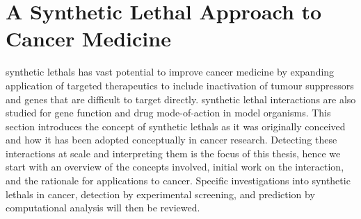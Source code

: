 
\section{A Synthetic Lethal Approach to Cancer Medicine}

\Glspl{synthetic lethal} has vast potential to improve cancer medicine by expanding application of targeted therapeutics to include inactivation of tumour suppressors and genes that are difficult to target directly. \Gls{synthetic lethal} interactions are also studied for gene function and drug mode-of-action in model organisms. This section introduces the concept of \glspl{synthetic lethal} as it was originally conceived and how it has been adopted conceptually in cancer research. Detecting these interactions at scale and interpreting them is the focus of this thesis, hence we start with an overview of the concepts involved, initial work on the interaction, and the rationale for applications to cancer. Specific investigations into \glspl{synthetic lethal} in cancer, detection by experimental screening, and prediction by computational analysis will then be reviewed.





